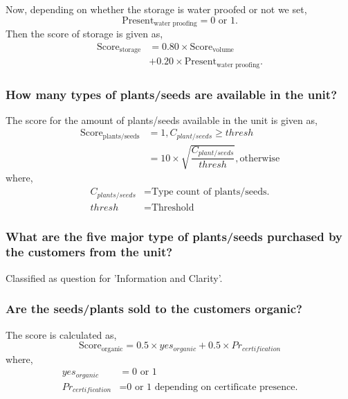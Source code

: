 \documentclass[oneside,twocolumn]{article}
\newcommand{\tsub}[2]{\text{#1}_{\text{#2}}}
\begin{document}
               Now, depending on whether the storage is water proofed or not
               we set,
               \[
               \tsub{Present}{water proofing} = 0 \text{ or } 1.
               \]
               Then the score of storage is given as,
               \begin{align*}
                 \tsub{Score}{storage} &= 0.80 \times \tsub{Score}{volume} \\
                 &+ 0.20 \times \tsub{Present}{water proofing}.
               \end{align*}

               \subsubsection{How many types of plants/seeds are available in the unit?}
               The score for the amount of plants/seeds available in the unit is
               given as,
               \begin{align*}
                 \tsub{Score}{plants/seeds} &= 1, C_{plant/seeds} \ge thresh \\
                 &= 10 \times \sqrt{\dfrac{C_{plant/seeds}}{thresh}}, \text{otherwise}
               \end{align*}
               where,
               \begin{align*}
                 C_{plants/seeds} &= \text{Type count of plants/seeds.} \\
                 thresh &= \text{Threshold}
               \end{align*}

               \subsubsection{What are the five major type of plants/seeds purchased by the customers from the unit?}
               Classified as question for 'Information and Clarity'.

               \subsubsection{Are the seeds/plants sold to the customers organic?}
               The score is calculated as,
               \[
               \tsub{Score}{organic} = 0.5 \times yes_{organic} + 0.5 \times Pr_{certification}
               \]
               where,
               \begin{align*}
                 yes_{organic} &= 0 \text{ or } 1 \\
                 Pr_{certification} &= \text{0 or 1 depending on certificate presence.}
               \end{align*}
\end{document}
